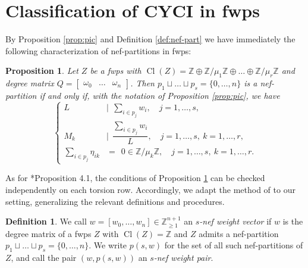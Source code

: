 \documentclass{amsart}
\DeclareMathOperator{\Cl}{Cl}
\newcommand{\Z}{\mathbb{Z}}
\newtheorem{proposition}[lem]{Proposition}
\theoremstyle{definition}
\newtheorem{definition}[lem]{Definition}
\begin{document}
\section{Classification of CYCI in fwps}

By Proposition \ref{prop:pic} and Definition \ref{def:nef-part} we have immediately the following characterization of nef-partitions in fwps:

\begin{proposition}\label{prop:nef-part}
    Let $Z$ be a fwps with $\Cl(Z)=\Z\oplus \Z/\mu_1\Z\oplus\dots\oplus\Z/\mu_r\Z$ and degree matrix $Q=\begin{bmatrix}
        \omega_0 & \dots & \omega_n
    \end{bmatrix}$. Then $p_1\sqcup\dots\sqcup p_s=\{0,\dots,n\}$ is a nef-partition if and only if, with the notation of Proposition \ref{prop:pic}, we have
    $$
    \begin{cases}
        L & | \ \ \sum_{i\in p_j} w_i,\quad j=1,\dots,s,\\[3pt]
        M_k & | \ \ \dfrac{\sum_{i\in p_j}w_i}{L},\quad j=1,\dots,s,\ k=1,\dots,r,\\[5pt]
        \sum_{i\in p_j}\eta_{ik} & =\ \ 0\in\Z/\mu_k\Z,\quad j=1,\dots,s,\ k=1,\dots,r.
    \end{cases}
    $$
\end{proposition}

As for \cite{Ghi}*{Proposition 4.1}, the conditions of Proposition \ref{prop:nef-part} can be checked independently on each torsion row. Accordingly, we adapt the method of \cite[Section 4]{Ghi} to our setting, generalizing the relevant definitions and procedures.

\begin{definition}\label{def: weight_vec}
    We call $w=[w_0,\dots,w_n]\in\Z^{n+1}_{\geq 1}$ an \emph{$s$-nef weight vector} if $w$ is the degree matrix of a fwps $Z$ with $\Cl(Z)=\Z$ and $Z$ admits a nef-partition $p_1\sqcup\dots\sqcup p_s=\{0,\dots,n\}$. We write $p(s,w)$ for the set of all such nef-partitions of $Z$, and call the pair $(w,p(s,w))$ an \emph{$s$-nef weight pair}.
\end{definition}
\end{document}
